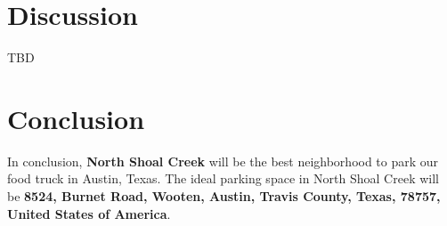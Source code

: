 \documentclass{deagle}
\begin{document}
\section*{Discussion}

TBD

\section*{Conclusion}

In conclusion, \textbf{North Shoal Creek} will be the best neighborhood to park our food truck in Austin, Texas. The ideal parking space in North Shoal Creek will be \textbf{8524, Burnet Road, Wooten, Austin, Travis County, Texas, 78757, United States of America}.
\end{document}
